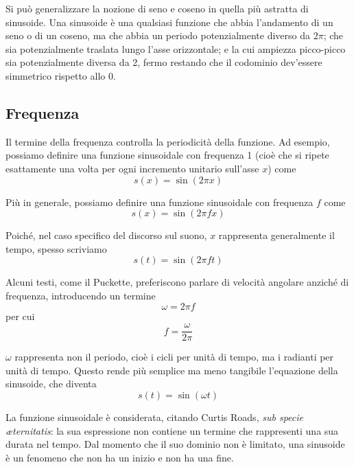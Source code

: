 \documentclass[11pt]{report}
\begin{document}
Si può generalizzare la nozione di seno e coseno in quella più astratta di sinusoide. Una sinusoide è una qualsiasi funzione che abbia l'andamento di un seno o di un coseno, ma che abbia un periodo potenzialmente diverso da $2 \pi$; che sia potenzialmente traslata lungo l'asse orizzontale; e la cui ampiezza picco-picco sia potenzialmente diversa da 2, fermo restando che il codominio dev'essere simmetrico rispetto allo 0.

\subsection{Frequenza}

Il termine della frequenza controlla la periodicità della funzione. Ad esempio, possiamo definire una funzione sinusoidale con frequenza 1 (cioè che si ripete esattamente una volta per ogni incremento unitario sull'asse $x$) come
\begin{equation}
s(x) = \sin(2 \pi x)
\end{equation}

Più in generale, possiamo definire una funzione sinusoidale con frequenza $f$ come
\begin{equation}
s(x) = \sin({2 \pi} f x)
\end{equation}

Poiché, nel caso specifico del discorso sul suono, $x$ rappresenta generalmente il tempo, spesso scriviamo
\begin{equation}
s(t) = \sin({2 \pi} f t)
\end{equation}

Alcuni testi, come il Puckette, preferiscono parlare di velocità angolare anziché di frequenza, introducendo un termine
\begin{equation}
\omega = 2 \pi f
\end{equation}
per cui
\begin{equation}
f = \frac{\omega}{2 \pi}
\end{equation}

$\omega$ rappresenta non il periodo, cioè i cicli per unità di tempo, ma i radianti per unità di tempo. Questo rende più semplice ma meno tangibile l'equazione della sinusoide, che diventa
\begin{equation}
s(t) = \sin(\omega t)
\end{equation}

La funzione sinusoidale è considerata, citando Curtis Roads, \emph{sub specie \ae{}ternitatis}: la sua espressione non contiene un termine che rappresenti una sua durata nel tempo. Dal momento che il suo dominio non è limitato, una sinusoide è un fenomeno che non ha un inizio e non ha una fine.
\end{document}
